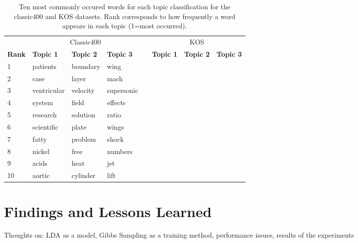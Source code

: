 \documentclass[10pt]{article}
\newcommand{\ra}[1]{\renewcommand{\arraystretch}{#1}}
\begin{document}
\begin{table}
	\centering
    \ra{1.2}
	\begin{tabular}{@{} l l l l c l l l @{}}
        \toprule
        & \multicolumn{3}{c}{Classic400} & \phantom{abc} & \multicolumn{3}{c}{KOS}\\
        \cmidrule{2-4} \cmidrule{6-8}
        \bf{Rank} & \bf{Topic 1} & \bf{Topic 2} & \bf{Topic 3} && \bf{Topic 1} & \bf{Topic 2} & \bf{Topic 3} \\
        \midrule
         1 & patients     & boundary     & wing         && & & \\
         2 & case         & layer        & mach         && & & \\
         3 & ventricular  & velocity     & supersonic   && & & \\
         4 & system       & field        & effects      && & & \\
         5 & research     & solution     & ratio        && & & \\
         6 & scientific   & plate        & wings        && & & \\
         7 & fatty        & problem      & shock        && & & \\
         8 & nickel       & free         & numbers      && & & \\
         9 & acids        & heat         & jet          && & & \\
        10 & aortic       & cylinder     & lift         && & & \\
        \bottomrule
	\end{tabular}
	\caption{Ten most commonly occured words for each topic classification for the classic400 and KOS datasets. Rank corresponds to how frequently a word appears in each topic (1=most occurred).}
	\label{tab:common_classic400}
\end{table}



\section{Findings and Lessons Learned}
\label{sec:conclusion}

Thoughts on: LDA as a model, Gibbs Sampling as a training method, performance issues, results of the experiments




\end{document}
